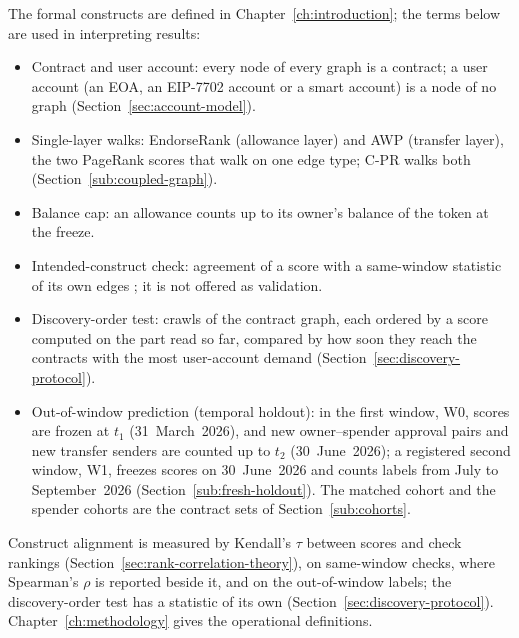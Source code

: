 
The formal constructs are defined in Chapter~\ref{ch:introduction}; the terms below are used in interpreting results:

\begin{itemize}
\item Contract and user account: every node of every graph is a contract; a user account (an EOA, an EIP-7702 account or a smart account) is a node of no graph (Section~\ref{sec:account-model}).
\item Single-layer walks: EndorseRank (allowance layer) and AWP (transfer layer), the two PageRank scores that walk on one edge type; \mbox{C-PR} walks both (Section~\ref{sub:coupled-graph}).
\item Balance cap: an allowance counts up to its owner's balance of the token at the freeze.
\item Intended-construct check: agreement of a score with a same-window statistic of its own edges \parencite{cronbach1955construct}; it is not offered as validation.
\item Discovery-order test: crawls of the contract graph, each ordered by a score computed on the part read so far, compared by how soon they reach the contracts with the most user-account demand (Section~\ref{sec:discovery-protocol}).
\item Out-of-window prediction (temporal holdout): in the first window, W0, scores are frozen at $t_1$ (31~March~2026), and new owner--spender approval pairs and new transfer senders are counted up to $t_2$ (30~June~2026); a registered second window, W1, freezes scores on 30~June~2026 and counts labels from July to September~2026 (Section~\ref{sub:fresh-holdout}). The matched cohort and the spender cohorts are the contract sets of Section~\ref{sub:cohorts}.
\end{itemize}


Construct alignment is measured by Kendall's $\tau$ between scores and check rankings (Section~\ref{sec:rank-correlation-theory}), on same-window checks, where Spearman's $\rho$ is reported beside it, and on the out-of-window labels; the discovery-order test has a statistic of its own (Section~\ref{sec:discovery-protocol}). Chapter~\ref{ch:methodology} gives the operational definitions.


